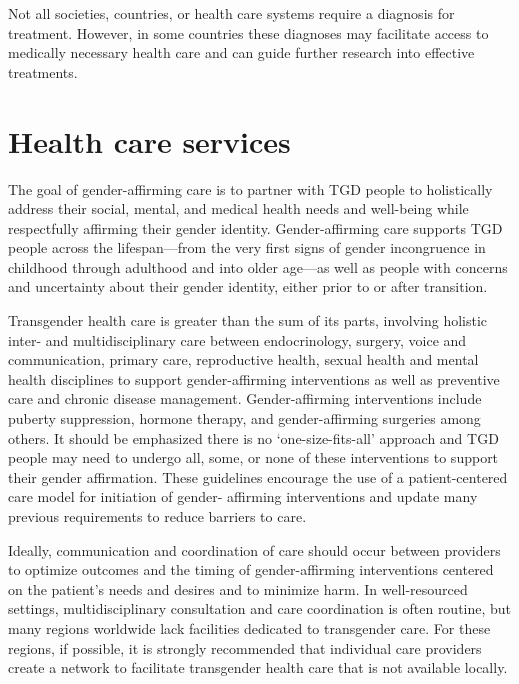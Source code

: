 \documentclass[
]{book}
\begin{document}
Not all societies, countries, or health care systems require a diagnosis for treatment. However,
in some countries these diagnoses may facilitate
access to medically necessary health care and can
guide further research into effective treatments.

\hypertarget{health-care-services}{%
\section*{Health care services}\label{health-care-services}}

The goal of gender-affirming care is to partner
with TGD people to holistically address their
social, mental, and medical health needs and
well-being while respectfully affirming their gender identity. Gender-affirming care supports TGD
people across the lifespan---from the very first
signs of gender incongruence in childhood
through adulthood and into older age---as well
as people with concerns and uncertainty about
their gender identity, either prior to or after
transition.

Transgender health care is greater than the
sum of its parts, involving holistic inter- and
multidisciplinary care between endocrinology,
surgery, voice and communication, primary care,
reproductive health, sexual health and mental
health disciplines to support gender-affirming
interventions as well as preventive care and
chronic disease management. Gender-affirming
interventions include puberty suppression, hormone therapy, and gender-affirming surgeries
among others. It should be emphasized there is
no `one-size-fits-all' approach and TGD people
may need to undergo all, some, or none of these
interventions to support their gender affirmation.
These guidelines encourage the use of a
patient-centered care model for initiation of gender- affirming interventions and update many
previous requirements to reduce barriers to care.

Ideally, communication and coordination of care
should occur between providers to optimize outcomes and the timing of gender-affirming interventions centered on the patient's needs and desires and
to minimize harm. In well-resourced settings, multidisciplinary consultation and care coordination is
often routine, but many regions worldwide lack facilities dedicated to transgender care. For these regions,
if possible, it is strongly recommended that individual care providers create a network to facilitate transgender health care that is not available locally.
\end{document}
